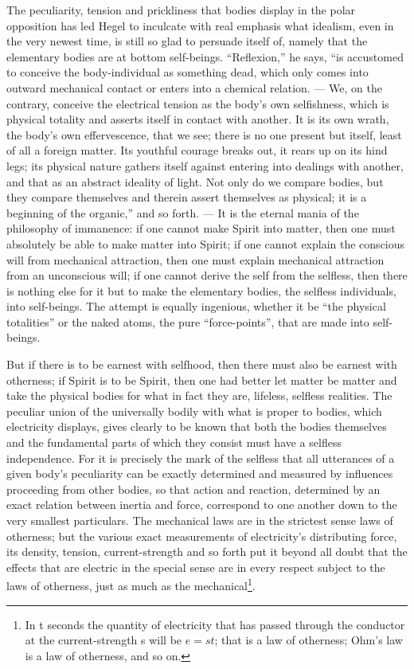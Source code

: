 \documentclass[12pt,a4paper]{book}
\begin{document}
The peculiarity, tension and prickliness that bodies display in the polar opposition has led Hegel to inculcate with real
emphasis what idealism, even in the very newest time, is still so glad to persuade itself of, namely that the elementary
bodies are at bottom self-beings. ``Reflexion,'' he says, ``is accustomed to conceive the body-individual as something
dead, which only comes into outward mechanical contact or enters into a chemical relation. --- We, on the contrary,
conceive the electrical tension as the body's own selfishness, which is physical totality and asserts itself in contact
with another. It is its own wrath, the body's own effervescence, that we see; there is no one present but itself, least
of all a foreign matter. Its youthful courage breaks out, it rears up on its hind legs; its physical nature gathers
itself against entering into dealings with another, and that as an abstract ideality of light. Not only do we compare
bodies, but they compare themselves and therein assert themselves as physical; it is a beginning of the organic,'' and so
forth. --- It is the eternal mania of the philosophy of immanence: if one cannot make Spirit into matter, then one must
absolutely be able to make matter into Spirit; if one cannot explain the conscious will from mechanical attraction, then
one must explain mechanical attraction from an unconscious will; if one cannot derive the self from the selfless, then
there is nothing else for it but to make the elementary bodies, the selfless individuals, into self-beings. The attempt
is equally ingenious, whether it be ``the physical totalities'' or the naked atoms, the pure ``force-points'', that are
made into self-beings.

But if there is to be earnest with selfhood, then there must also be earnest with otherness; if Spirit is to be Spirit,
then one had better let matter be matter and take the physical bodies for what in fact they are, lifeless, selfless
realities. The peculiar union of the universally bodily with what is
proper to bodies, which electricity displays, gives clearly to be known that both the bodies themselves and the
fundamental parts of which they consist must have a selfless independence. For it is precisely the mark of the selfless
that all utterances of a given body's peculiarity can be exactly determined and measured by influences proceeding from
other bodies, so that action and reaction, determined by an exact relation between inertia and force, correspond to one
another down to the very smallest particulars. The mechanical laws are in the strictest sense laws of otherness; but the
various exact measurements of electricity's distributing force, its density, tension, current-strength and so forth put
it beyond all doubt that the effects that are electric in the special sense are in every respect subject to the laws of
otherness, just as much as the
mechanical\footnote{%
In t seconds the quantity of electricity that has passed through the conductor at the current-strength s will be
$e = st$; that is a law of otherness; Ohm's law is a law of otherness, and so on.}.
\end{document}

